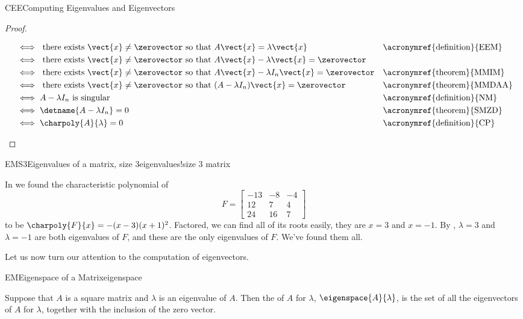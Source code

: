 \begin{subsect}{CEE}{Computing Eigenvalues and Eigenvectors}
\begin{proof}
\begin{para}
\begin{align*}
%
&\iff\text{ there exists $\vect{x}\neq\zerovector$ so that $A\vect{x}=\lambda\vect{x}$}
&&\text{\acronymref{definition}{EEM}}\\
%
&\iff \text{ there exists $\vect{x}\neq\zerovector$ so that $A\vect{x}-\lambda\vect{x}=\zerovector$}\\
%
&\iff \text{ there exists $\vect{x}\neq\zerovector$ so that $A\vect{x}-\lambda I_n\vect{x}=\zerovector$}
&&\text{\acronymref{theorem}{MMIM}}\\
%
&\iff\text{ there exists $\vect{x}\neq\zerovector$ so that $(A-\lambda I_n)\vect{x}=\zerovector$}
&&\text{\acronymref{theorem}{MMDAA}}\\
%
&\iff A-\lambda I_n\text{ is singular}
&&\text{\acronymref{definition}{NM}}\\
%
&\iff\detname{A-\lambda I_n}=0
&&\text{\acronymref{theorem}{SMZD}}\\
%
&\iff\charpoly{A}{\lambda}=0
&&\text{\acronymref{definition}{CP}}
%
\end{align*}
\end{para}
%
\end{proof}
%
\begin{example}{EMS3}{Eigenvalues of a matrix, size 3}{eigenvalues!size 3 matrix}
\begin{para}In  we found the characteristic polynomial of
%
\begin{equation*}
F=
\begin{bmatrix}
-13 & -8 & -4\\
12 & 7 & 4\\
24 & 16 & 7
\end{bmatrix}
\end{equation*}
%
to be  $\charpoly{F}{x}=-(x-3)(x+1)^2$.  Factored, we can find all of its roots easily, they are $x=3$ and $x=-1$.  By , $\lambda=3$ and $\lambda=-1$ are both eigenvalues of $F$, and these are the only eigenvalues of $F$.  We've found them all.\end{para}
%
\end{example}
%
\begin{para}Let us now turn our attention to the computation of eigenvectors.\end{para}
%
\begin{definition}{EM}{Eigenspace of a Matrix}{eigenspace}
\begin{para}Suppose that $A$ is a square matrix and $\lambda$ is an eigenvalue of $A$.  Then the  of $A$ for $\lambda$, $\eigenspace{A}{\lambda}$, is the set of all the eigenvectors of $A$ for $\lambda$, together with the inclusion of the zero vector.\end{para}

\end{definition}
\end{subsect}
